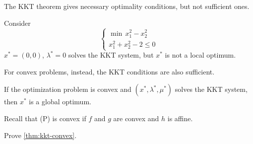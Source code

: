 The KKT theorem gives necessary optimality conditions, but not sufficient ones.

\begin{example}
    Consider
    \[
        \begin{cases}
            \min\, x_1^2 - x_2^2\\
            x_1^2 + x_2^2 - 2 \le 0
        \end{cases}
    \]
    $x^* = (0, 0)$, $\lambda^* = 0$ solves the KKT system, but $x^*$ is not a local optimum.
\end{example}

For convex problems, instead, the KKT conditions are also sufficient.

\begin{theorem}
    \label{thm:kkt-convex}
    If the optimization problem is convex and $(x^*, \lambda^*, \mu^*)$ solves the KKT system, then $x^*$ is a global optimum.
\end{theorem}

Recall that (P) is convex if $f$ and $g$ are convex and $h$ is affine.

 Prove \cref{thm:kkt-convex}.
